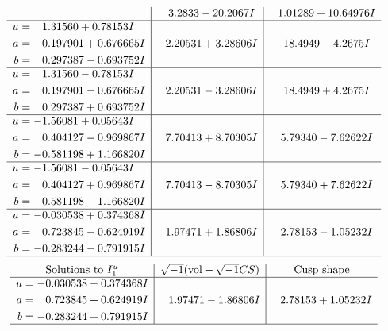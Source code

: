 \documentclass[1p]{elsarticle_modified}
\theoremstyle{definition}
\newcommand{\I}{\sqrt{-1}}
\begin{document}
$$\begin{array}{c|c|c}
 & \phantom{-}3.2833 - 20.2067 I & \phantom{-}1.01289 + 10.64976 I \\ \hline\begin{aligned}
u &= \phantom{-}1.31560 + 0.78153 I \\
a &= \phantom{-}0.197901 + 0.676665 I \\
b &= \phantom{-}0.297387 - 0.693752 I\end{aligned}
 & \phantom{-}2.20531 + 3.28606 I & \phantom{-}18.4949 - 4.2675 I \\ \hline\begin{aligned}
u &= \phantom{-}1.31560 - 0.78153 I \\
a &= \phantom{-}0.197901 - 0.676665 I \\
b &= \phantom{-}0.297387 + 0.693752 I\end{aligned}
 & \phantom{-}2.20531 - 3.28606 I & \phantom{-}18.4949 + 4.2675 I \\ \hline\begin{aligned}
u &= -1.56081 + 0.05643 I \\
a &= \phantom{-}0.404127 - 0.969867 I \\
b &= -0.581198 + 1.166820 I\end{aligned}
 & \phantom{-}7.70413 + 8.70305 I & \phantom{-}5.79340 - 7.62622 I \\ \hline\begin{aligned}
u &= -1.56081 - 0.05643 I \\
a &= \phantom{-}0.404127 + 0.969867 I \\
b &= -0.581198 - 1.166820 I\end{aligned}
 & \phantom{-}7.70413 - 8.70305 I & \phantom{-}5.79340 + 7.62622 I \\ \hline\begin{aligned}
u &= -0.030538 + 0.374368 I \\
a &= \phantom{-}0.723845 - 0.624919 I \\
b &= -0.283244 - 0.791915 I\end{aligned}
 & \phantom{-}1.97471 + 1.86806 I & \phantom{-}2.78153 - 1.05232 I\\
 \hline 
 \end{array}$$\newpage$$\begin{array}{c|c|c}  
\text{Solutions to }I^u_{1}& \I (\text{vol} + \sqrt{-1}CS) & \text{Cusp shape}\\
 \hline 
\begin{aligned}
u &= -0.030538 - 0.374368 I \\
a &= \phantom{-}0.723845 + 0.624919 I \\
b &= -0.283244 + 0.791915 I\end{aligned}
 & \phantom{-}1.97471 - 1.86806 I & \phantom{-}2.78153 + 1.05232 I\\
 \hline 
 \end{array}$$\newpage\newpage\renewcommand{\arraystretch}{1}
\end{document}
